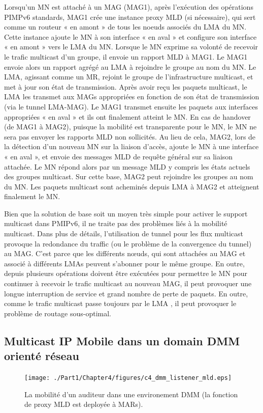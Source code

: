 Lorsqu'un MN est attaché à un MAG (MAG1), après l'exécution des opérations PIMPv6 standards, MAG1 crée une instance proxy MLD (si nécessaire), qui sert comme un routeur « en amont » de tous les noeuds associés du LMA du MN. Cette instance ajoute le MN à son interface « en aval » et configure son interface « en amont » vers le LMA du MN. Lorsque le MN exprime sa volonté de recevoir le trafic multicast d'un groupe, il envoie un rapport MLD à MAG1. Le MAG1 envoie alors un rapport agrégé au LMA à rejoindre le groupe au nom du MN. Le LMA, agissant comme un MR, rejoint le groupe de l'infrastructure multicast, et met à jour son état de transmission. Après avoir reçu les paquets multicast, le LMA les transmet aux MAGs appropriées en fonction de son état de transmission (via le tunnel LMA-MAG). Le MAG1 transmet ensuite les paquets aux interfaces appropriées « en aval » et ils ont finalement atteint le MN. En cas de handover (de MAG1 à MAG2), puisque la mobilité est transparente pour le MN, le MN ne sera pas envoyer les rapports MLD non sollicités. Au lieu de cela, MAG2, lors de la détection d'un nouveau MN sur la liaison d'accès, ajoute le MN à une interface « en aval », et envoie des messages MLD de requête général sur sa liaison attachée. Le MN répond alors par un message MLD y compris les états actuels des groupes multicast. Sur cette base, MAG2 peut rejoindre les groupes au nom du MN. Les paquets multicast sont acheminés depuis LMA à MAG2 et atteignent finalement le MN.

Bien que la solution de base soit un moyen très simple pour activer le support multicast dans PMIPv6, il ne traite pas des problèmes liés à la mobilité multicast. Dans plus de détails, l'utilisation de tunnel pour les flux multicast provoque la redondance du traffic (ou le problème de la convergence du tunnel) au MAG. C'est parce que les différents nœuds, qui sont attachées au MAG et associé à différents LMAs peuvent s'abonner pour le même groupe. En outre, depuis plusieurs opérations doivent être exécutées pour permettre le MN pour continuer à recevoir le trafic multicast au nouveau MAG, il peut provoquer une longue interruption de service et grand nombre de perte de paquets. En outre, comme le trafic multicast passe toujours par le LMA , il peut provoquer le problème de routage sous-optimal.


\subsection{Multicast IP Mobile dans un domain DMM orienté réseau}
\begin{figure}[h!] 
 \begin{center} 
 \texttt{[image: ./Part1/Chapter4/figures/c4\_dmm\_listener\_mld.eps]} 
    \caption{La mobilité d'un auditeur dans une environement DMM (la fonction de proxy MLD est deployée à MARs).}
     \label{fig:c4_dmm_listener_mld}
  \end{center} 
\end{figure}

